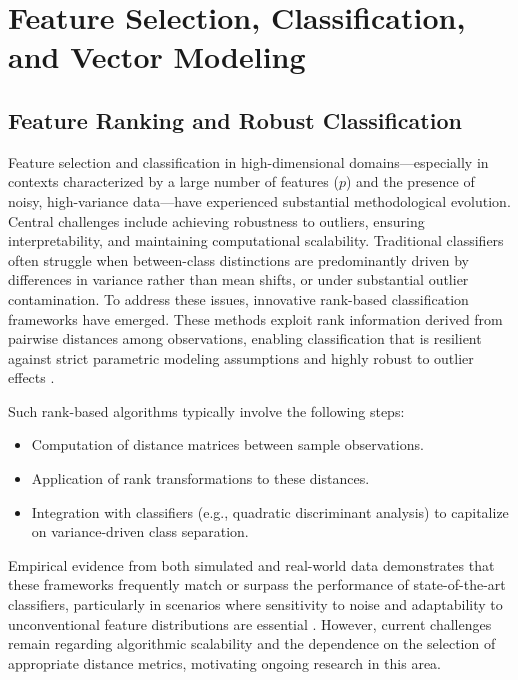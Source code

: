 \documentclass[sigconf]{acmart}
\begin{document}
\section{Feature Selection, Classification, and Vector Modeling}

\subsection{Feature Ranking and Robust Classification}

Feature selection and classification in high-dimensional domains—especially in contexts characterized by a large number of features ($p$) and the presence of noisy, high-variance data—have experienced substantial methodological evolution. Central challenges include achieving robustness to outliers, ensuring interpretability, and maintaining computational scalability. Traditional classifiers often struggle when between-class distinctions are predominantly driven by differences in variance rather than mean shifts, or under substantial outlier contamination. To address these issues, innovative rank-based classification frameworks have emerged. These methods exploit rank information derived from pairwise distances among observations, enabling classification that is resilient against strict parametric modeling assumptions and highly robust to outlier effects \cite{ref102}.

Such rank-based algorithms typically involve the following steps:

\begin{itemize}
    \item Computation of distance matrices between sample observations.
    \item Application of rank transformations to these distances.
    \item Integration with classifiers (e.g., quadratic discriminant analysis) to capitalize on variance-driven class separation.
\end{itemize}

Empirical evidence from both simulated and real-world data demonstrates that these frameworks frequently match or surpass the performance of state-of-the-art classifiers, particularly in scenarios where sensitivity to noise and adaptability to unconventional feature distributions are essential \cite{ref103}. However, current challenges remain regarding algorithmic scalability and the dependence on the selection of appropriate distance metrics, motivating ongoing research in this area.
\end{document}
